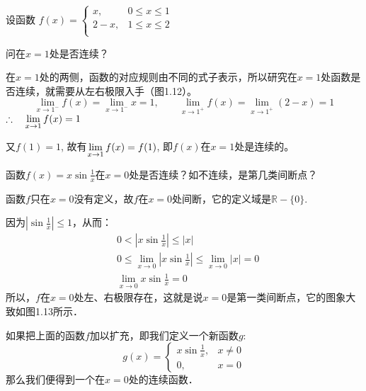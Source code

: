 \begin{example}
    设函数
$f (x) =\begin{cases}
     x,& 0\le x\le 1 \\ 2-x,& 1\le x\le 2\\
\end{cases}$

问在$x=1$处是否连续？
\end{example}

\begin{solution}
  在$x=1$处的两侧，函数的对应规则由不同的式子表示，所以研究在$x=1$处函数是否连续，就需要从左右极限入手（图1.12）。
\[  \lim_{x\to 1^-} f (x) =\lim_{x\to 1^-} x=1,\qquad  \lim_{x\to 1^+} f (x) =\lim_{x\to 1^+} (2-x)=1\]
$\therefore\quad \displaystyle\lim_{x\to 1}f(x)=1$

又$f(1)=1$, 故有$\displaystyle\lim_{x\to 1}f(x)=f(1)$, 即$f(x)$在$x=1$处是连续的。
\end{solution}

\begin{example}
    函数$f(x)=x\sin\frac{1}{x}$在$x=0$处是否连续？如不连续，是第几类间断点？
\end{example}

\begin{solution}
    函数$f$只在$x=0$没有定义，故$f$在$x=0$处间断，它的定义域是$\mathbb{R}-\{0\}$.

因为$\left|\sin\frac{1}{x}\right|\le 1$，从而：    
\[\begin{split}
   & 0<\left|x\sin\frac{1}{x}\right|\le |x|\\
&0\le \lim_{x\to 0}\left|x\sin\frac{1}{x}\right|\le \lim_{x\to 0}|x|=0\\
&\lim_{x\to 0}x\sin\frac{1}{x}=0
\end{split}\]
所以，$f$在$x=0$处左、右极限存在，这就是说$x=0$是第一类间断点，它的图象大致如图1.13所示．

\begin{figure}[htp]
    \centering
{}
    \caption{}
\end{figure}


如果把上面的函数$f$加以扩充，即我们定义一个新函数$g$:
\[g(x)=\begin{cases}
    x\sin\frac{1}{x},& x\ne 0\\
    0,& x=0
\end{cases}\]
那么我们便得到一个在$x=0$处的连续函数．
\end{solution}

